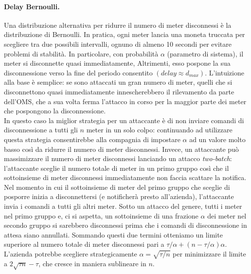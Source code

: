 \paragraph{Delay Bernoulli.} Una distribuzione alternativa per ridurre il numero di meter disconnessi è la distribuzione di Bernoulli. In pratica, ogni meter lancia una moneta truccata per scegliere tra due possibili intervalli, ognuno di almeno 10 secondi per evitare problemi di stabilità. In particolare, con probabilità $\alpha$ (parametro di sistema), il meter si disconnette quasi immediatamente, Altrimenti, esso pospone la sua disconnessione verso la fine del periodo consentito $(delay \approx d_{max})$. L'intuizione alla base è semplice: se sono attaccati un gran numero di meter, quelli che si disconnettono quasi immediatamente innescherebbero il rilevamento da parte dell'OMS, che a sua volta ferma l'attacco in corso per la maggior parte dei meter che pospongono la disconnessione.\\
In questo caso la miglior strategia per un attaccante è di non inviare comandi di disconnessione a tutti gli $n$ meter in un solo colpo: continuando ad utilizzare questa strategia consentirebbe alla compagnia di impostare $\alpha$ ad un valore molto basso così da ridurre il numero di meter disconnessi. Invece, un attaccante può massimizzare il numero di meter disconnessi lanciando un attacco \emph{two-batch}: l'attaccante sceglie il numero totale di meter in un primo gruppo così che il sottoinsieme di meter disconnessi immediatamente non faccia scattare la notifica. Nel momento in cui il sottoinsieme di meter del primo gruppo che sceglie di posporre inizia a disconnettersi (e notificherà presto all'azienda), l'attaccante invia i comandi a tutti gli altri meter. Sotto un attacco del genere, tutti i meter nel primo gruppo e, ci si aspetta, un sottoinsieme di una frazione $\alpha$ dei meter nel secondo gruppo si sarebbero disconnessi prima che i comandi di disconnessione in attesa siano annullati. Sommando questi due termini otteniamo un limite superiore al numero totale di meter disconnessi pari a $\tau/\alpha + (n - \tau/\alpha)\alpha$. L'azienda potrebbe scegliere strategicamente $\alpha = \sqrt{\tau/n}$ per minimizzare il limite a $2\sqrt{\tau n} - \tau$, che cresce in maniera sublineare in $n$.
